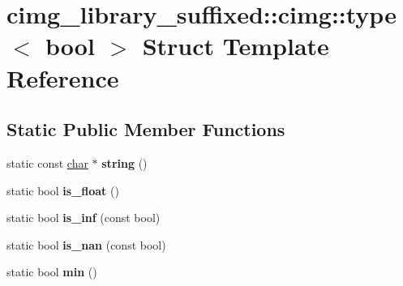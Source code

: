\hypertarget{structcimg__library__suffixed_1_1cimg_1_1type_3_01bool_01_4}{}\section{cimg\+\_\+library\+\_\+suffixed\+:\+:cimg\+:\+:type$<$ bool $>$ Struct Template Reference}
\label{structcimg__library__suffixed_1_1cimg_1_1type_3_01bool_01_4}
\subsection*{Static Public Member Functions}
\begin{DoxyCompactItemize}
\item 
\mbox{\label{structcimg__library__suffixed_1_1cimg_1_1type_3_01bool_01_4_adc3f5e982ce3c433b5c57ad334da94c0}} 
static const \hyperlink{classchar}{char} $\ast$ {\bfseries string} ()
\item 
\mbox{\label{structcimg__library__suffixed_1_1cimg_1_1type_3_01bool_01_4_ace8bc9fba0a146f24c744e18229f6ce0}} 
static bool {\bfseries is\+\_\+float} ()
\item 
\mbox{\label{structcimg__library__suffixed_1_1cimg_1_1type_3_01bool_01_4_a483402e69314ffdeaa8cbc78828c4080}} 
static bool {\bfseries is\+\_\+inf} (const bool)
\item 
\mbox{\label{structcimg__library__suffixed_1_1cimg_1_1type_3_01bool_01_4_a0d74a721ee4f1a8724954d72e3c9aab2}} 
static bool {\bfseries is\+\_\+nan} (const bool)
\item 
\mbox{\label{structcimg__library__suffixed_1_1cimg_1_1type_3_01bool_01_4_a1d4600e46a2bf087bfab475aa275dd7b}} 
static bool {\bfseries min} ()
\item 
\mbox{\label{structcimg__library__suffixed_1_1cimg_1_1type_3_01bool_01_4_a6f17a980a5bade56ecfef688b84d8047}} 

\end{DoxyCompactItemize}

